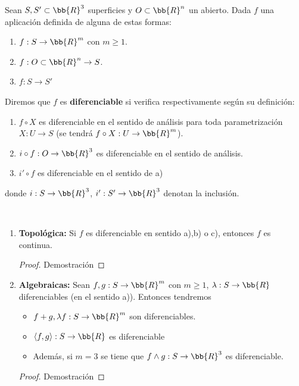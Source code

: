 
\begin{definicion}
    Sean $S,S'\subset \bb{R}^3$ superficies y $O\subset \bb{R}^n$ un abierto. Dada $f$ una aplicación definida de alguna de estas formas:
    \begin{enumerate}
        \item[a)] $f:S\to \bb{R}^m$ con $m\geq 1$.
        \item[b)] $f:O\subset \bb{R}^n \to S$.
        \item[c)] $f:S \to S'$
    \end{enumerate}
    Diremos que $f$ es \textbf{diferenciable} si verifica respectivamente según su definición:
    \begin{enumerate}
        \item[a)] $f \circ X$ es diferenciable en el sentido de análisis para toda parametrización $X:U\to S$ (se tendrá $f \circ X: U\to \bb{R}^m$).
        \item[b)] $i \circ f: O\to \bb{R}^3$ es diferenciable en el sentido de análisis.
        \item[c)] $i' \circ f$ es diferenciable en el sentido de a)
    \end{enumerate}
    donde $i:S \to \bb{R}^3$, $i':S' \to \bb{R}^3$ denotan la inclusión.
\end{definicion}

\begin{propiedades}\
    \begin{enumerate}
        \item \textbf{Topológica:} Si $f$ es diferenciable en sentido a),b) o c), entonces $f$ es continua. 
        \begin{proof}
            Demostración
        \end{proof}
        \item \textbf{Algebraicas:} Sean $f,g:S\to \bb{R}^m$ con $m\geq 1$, $\lambda: S\to \bb{R}$ diferenciables (en el sentido a)). Entonces tendremos
        \begin{itemize}
            \item $f+g, \lambda f: S\to \bb{R}^m$ son diferenciables.
            \item $\langle f,g \rangle: S\to \bb{R}$ es diferenciable
            \item Además, si $m=3$ se tiene que $f \wedge g:S \to \bb{R}^3$ es diferenciable.
        \end{itemize}
        \begin{proof}
            Demostración
        \end{proof}
    \end{enumerate}
\end{propiedades}

